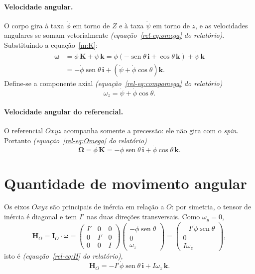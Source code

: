 \documentclass[11pt,a4paper]{article}
\newcommand{\vet}[1]{\mathbf{#1}}
\newcommand{\vomega}{\boldsymbol{\omega}}
\newcommand{\vOmega}{\boldsymbol{\Omega}}
\newcommand{\seno}{\operatorname{sen}}
\newcommand{\phid}{\dot{\phi}}
\newcommand{\psid}{\dot{\psi}}
\newcommand{\rel}[1]{\textit{(equação~\ref*{rel-eq:#1} do relatório)}}
\begin{document}
\paragraph{Velocidade angular.} O corpo gira à taxa $\phid$ em torno de $Z$ e à taxa $\psid$ em torno de $z$, e as velocidades angulares se somam vetorialmente \rel{omega}. Substituindo a equação~\ref{m:K}:
\begin{align}
\vomega &= \phid\,\vet{K}+\psid\,\vet{k}
         = \phid\left(-\seno\theta\,\vet{i}+\cos\theta\,\vet{k}\right)+\psid\,\vet{k}\nonumber\\
        &= -\phid\seno\theta\,\vet{i}+\left(\psid+\phid\cos\theta\right)\vet{k}.
\end{align}
Define-se a componente axial \rel{compomega}
\begin{equation}
\omega_z=\psid+\phid\cos\theta.\label{m:wz}
\end{equation}

\paragraph{Velocidade angular do referencial.} O referencial $Oxyz$ acompanha somente a precessão: ele não gira com o \textit{spin}. Portanto \rel{Omega}
\begin{equation}
\vOmega=\phid\,\vet{K}=-\phid\seno\theta\,\vet{i}+\phid\cos\theta\,\vet{k}.\label{m:Omega}
\end{equation}

\section{Quantidade de movimento angular}

Os eixos $Oxyz$ são principais de inércia em relação a $O$: por simetria, o tensor de inércia é diagonal e tem $I'$ nas duas direções transversais. Como $\omega_y=0$,
\begin{equation}
\vet{H}_O=\vet{I}_O\cdot\vomega=
\begin{pmatrix}I'&0&0\\0&I'&0\\0&0&I\end{pmatrix}
\begin{pmatrix}-\phid\seno\theta\\0\\\omega_z\end{pmatrix}
=\begin{pmatrix}-I'\phid\seno\theta\\0\\I\omega_z\end{pmatrix},
\end{equation}
isto é \rel{H},
\begin{equation}
\vet{H}_O=-I'\phid\seno\theta\,\vet{i}+I\omega_z\,\vet{k}.\label{m:H}
\end{equation}
\end{document}
